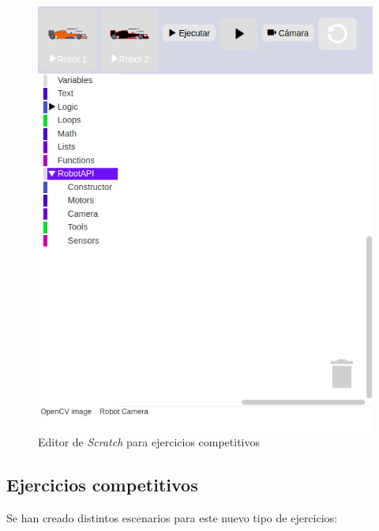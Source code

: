     \begin{figure}[H]
        \centering            
        \includegraphics[scale=0.30]{img/competitivoEditorScratch.png}
        \caption{Editor de \textit{Scratch} para ejercicios competitivos}
        \label{fig:scratch_competitivo}
    \end{figure}
    

\subsection{Ejercicios competitivos}

Se han creado distintos escenarios para este nuevo tipo de ejercicios:

